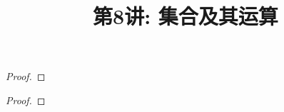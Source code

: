 \documentclass[a4paper, justified]{tufte-handout}
\title{第8讲: 集合及其运算}
\date{\zhtoday} %
\begin{document}
\maketitle
\noplagiarism %
\begin{abstract}
  \begin{center}{}
  \end{center}
\end{abstract}
\beginrequired

\begin{problem}[UD Problem 6.6 (f, g)]
\end{problem}

\begin{solution}
\end{solution}

\begin{problem}[UD Problem 7.1 (d, f)]
\end{problem}

\begin{solution}
\end{solution}

\begin{problem}[UD Problem 7.2]
\end{problem}

\begin{proof}
\end{proof}

\begin{problem}[UD Problem 7.14]
\end{problem}

\begin{solution}
\end{solution}

\begin{problem}[UD Problem 7.19]
\end{problem}

\begin{proof}
\end{proof}
\end{document}
